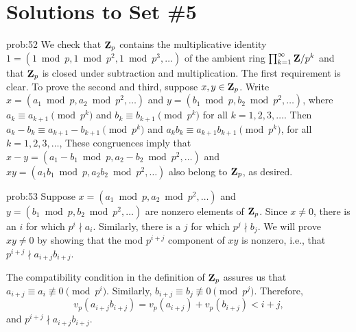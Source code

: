
\chapter*{Solutions to Set \#5}
\label{set4sols}

\begin{sol}{prob:52} We check that $\mathbf{Z}_p$ contains the multiplicative identity $1 = (1\bmod{p}, 1\bmod{p^2}, 1\bmod{p^3}, \dots)$ of the ambient ring $\prod_{k=1}^{\infty} \mathbf{Z}/p^k$ and that $\mathbf{Z}_p$ is closed under subtraction and multiplication. The first requirement is clear. To prove the second and third, suppose $x, y \in \mathbf{Z}_{p}$. Write $x = (a_1\bmod{p}, a_2\bmod{p^2},\dots)$ and $y =  (b_1\bmod{p}, b_2\bmod{p^2},\dots)$, where $a_k \equiv a_{k+1} \pmod{p^k}$ and $b_k \equiv b_{k+1}\pmod{p^k}$
for all $k=1,2,3,\dots$. Then $a_k - b_k \equiv a_{k+1} - b_{k+1} \pmod{p^k}$ and $a_k b_k \equiv a_{k+1} b_{k+1} \pmod{p^k}$, for all $k=1,2,3,\dots$, These congruences imply that $x-y =(a_1-b_1\bmod{p},a_2-b_2\bmod{p^2}, \dots)$ and $xy = (a_1 b_1\bmod{p}, a_2 b_2\bmod{p^2}, \dots)$ also belong to $\mathbf{Z}_p$, as desired.
\end{sol}

\begin{sol}{prob:53} Suppose $x = (a_1\bmod{p},a_2\bmod{p^2}, \dots)$ and $y = (b_1\bmod{p}, b_2\bmod{p^2}, \dots)$ are nonzero elements of $\mathbf{Z}_p$. Since $x\ne 0$, there is an $i$ for which $p^i \nmid a_i$. Similarly, there is a $j$ for which $p^j \nmid b_j$. We will prove $xy\ne 0$ by showing that the mod $p^{i+j}$ component of $xy$ is nonzero, i.e., that $p^{i+j} \nmid a_{i+j} b_{i+j}$. 

The compatibility condition in the definition of $\mathbf{Z}_p$ assures us that $a_{i+j} \equiv a_i \not \equiv 0 \pmod{p^i}$. Similarly, $b_{i+j} \equiv b_j \not\equiv 0 \pmod{p^j}$. Therefore,
\[ v_p(a_{i+j} b_{i+j}) = v_p(a_{i+j}) + v_p(b_{i+j}) < i+j,\]
and $p^{i+j} \nmid a_{i+j} b_{i+j}$.
\end{sol}

